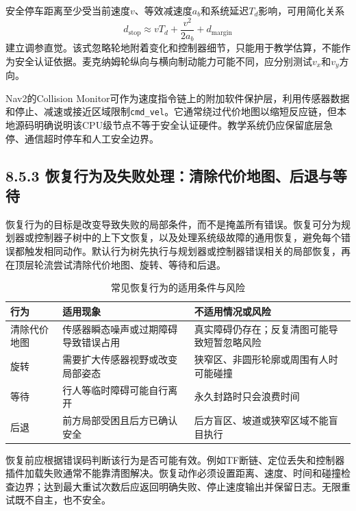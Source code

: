 \documentclass[UTF8,zihao=-4]{ctexart}
\begin{document}
安全停车距离至少受当前速度$v$、等效减速度$a_b$和系统延迟$T_d$影响，可用简化关系
\begin{equation}
  d_{\mathrm{stop}}\approx vT_d+\frac{v^2}{2a_b}+d_{\mathrm{margin}}
  \label{eq:stopping-distance}
\end{equation}
建立调参直觉。该式忽略轮地附着变化和控制器细节，只能用于教学估算，不能作为安全认证依据。麦克纳姆轮纵向与横向制动能力可能不同，应分别测试$v_x$和$v_y$方向。

Nav2的Collision Monitor可作为速度指令链上的附加软件保护层，利用传感器数据和停止、减速或接近区域限制\texttt{cmd\_vel}。它通常绕过代价地图以缩短反应链，但本地源码明确说明该CPU级节点不等于安全认证硬件\cite{navigation2source}。教学系统仍应保留底层急停、通信超时停车和人工安全边界。

\subsection*{8.5.3 恢复行为及失败处理：清除代价地图、后退与等待}

恢复行为的目标是改变导致失败的局部条件，而不是掩盖所有错误。恢复可分为规划器或控制器子树中的上下文恢复，以及处理系统级故障的通用恢复，避免每个错误都触发相同动作\cite{macenski2020nav2}。默认行为树先执行与规划器或控制器错误相关的局部恢复，再在顶层轮流尝试清除代价地图、旋转、等待和后退\cite{navigation2source}。

\begin{table}[htbp]
  \centering
  \caption{常见恢复行为的适用条件与风险}
  \begin{tabular}{p{}p{}p{}}
    \toprule
    行为 & 适用现象 & 不适用情况或风险 \\
    \midrule
    清除代价地图 & 传感器瞬态噪声或过期障碍导致错误占用 & 真实障碍仍存在；反复清图可能导致短暂忽略风险 \\
    旋转 & 需要扩大传感器视野或改变局部姿态 & 狭窄区、非圆形轮廓或周围有人时可能碰撞 \\
    等待 & 行人等临时障碍可能自行离开 & 永久封路时只会浪费时间 \\
    后退 & 前方局部受困且后方已确认安全 & 后方盲区、坡道或狭窄区域不能盲目执行 \\
    \bottomrule
  \end{tabular}
\end{table}

恢复前应根据错误码判断该行为是否可能有效。例如TF断链、定位丢失和控制器插件加载失败通常不能靠清图解决。恢复动作必须设置距离、速度、时间和碰撞检查边界；达到最大重试次数后应返回明确失败、停止速度输出并保留日志。无限重试既不自主，也不安全。
\end{document}

